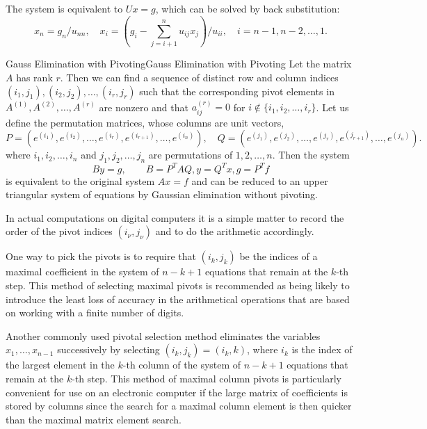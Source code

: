 \documentclass[../main.tex]{subfiles}
\begin{document}
The system is equivalent to $Ux = g$, which can be solved by back substitution:
\begin{equation*}
	x_n = g_n / u_{nn}, \quad x_i = (g_i - \sum_{j=i+1}^n u_{ij} x_j) / u_{ii}, \quad i = n-1, n-2, \ldots, 1.
\end{equation*}

\begin{theorem}{Gauss Elimination with Pivoting}{Gauss Elimination with Pivoting}
	Let the matrix $A$ has rank $r$. Then we can find a sequence of distinct row and column indices $(i_1, j_1), (i_2,j_2), \ldots , (i_r,j_r)$ such that the corresponding pivot elements in $A^{(1)}, A^{(2)}, \ldots, A^{(r)}$ are nonzero and that $a_{ij}^{(r)} = 0$ for $i \notin \{i_1, i_2, \ldots, i_r\}$. Let us define the permutation matrices, whose columns are unit vectors,
	\begin{equation*}
		P = (e^{(i_1)}, e^{(i_2)}, \ldots, e^{(i_r)}, e^{(i_{r+1})}, \ldots, e^{(i_n)}), \quad Q = (e^{(j_1)}, e^{(j_2)}, \ldots, e^{(j_r)}, e^{(j_{r+1})}, \ldots, e^{(j_n)}).
	\end{equation*}
	where $i_1, i_2, \ldots, i_n$ and $j_1, j_2, \ldots, j_n$ are permutations of $1, 2, \ldots, n$. Then the system
	\begin{equation*}
		B y = g, \qquad B = P^T A Q, y = Q^T x, g = P^T f
	\end{equation*}
	is equivalent to the original system $Ax = f$ and can be reduced to an upper triangular system of equations by Gaussian elimination without pivoting.
\end{theorem}

In actual computations on digital computers it is a simple matter to record the order of the pivot indices $(i_\nu, j_\nu)$ and to do the arithmetic accordingly.

\begin{remark}
	One way to pick the pivots is to require that $(i_k, j_k)$ be the indices of a maximal coefficient in the system of $n-k+1$ equations that remain at the $k$-th step. This method of selecting maximal pivots is recommended as being likely to introduce the least loss of accuracy in the arithmetical operations that are based on working with a finite number of digits.
	\medskip

	Another commonly used pivotal selection method eliminates the variables $x_1, \ldots ,x_{n-1}$ successively by selecting $(i_k, j_k) = (i_k, k)$, where $i_k$ is the index of the largest element in the $k$-th column of the system of $n-k+1$ equations that remain at the $k$-th step. This method of maximal column pivots is particularly convenient for use on an electronic computer if the large matrix of coefficients is stored by columns since the search for a maximal column element is then quicker than the maximal matrix element search.
\end{remark}
\end{document}
